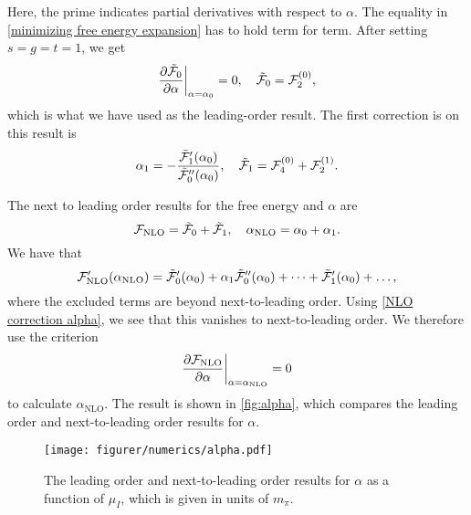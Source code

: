 Here, the prime indicates partial derivatives with respect to $\alpha$.
The equality in \cref{minimizing free energy expansion} has to hold term for term.
After setting $s = g = t = 1$, we get
\begin{align*}
    \diffp{\tilde \Ef_0}{\alpha}\bigg|_{\alpha=\alpha_0} = 0, \quad
    \tilde \Ef_0 = \Ef_2^{(0)},
\end{align*}
which is what we have used as the leading-order result. 
The first correction is on this result is
\begin{equation}
    \label{NLO correction alpha}
    \alpha_1 = - \frac{\tilde {\mathcal{F}}_1'(\alpha_0)}{{\tilde {\mathcal{F}}_0''(\alpha_0)}},
    \quad 
    \tilde {\mathcal{F}}_1 = \mathcal{F}_{4}^{(0)} + \mathcal{F}_{2}^{(1)}.
\end{equation}

The next to leading order results for the free energy and $\alpha$ are
\begin{equation}
    \mathcal{F}_\mathrm{NLO} = \tilde {\mathcal{F}}_0 + \tilde {\mathcal{F}}_1, \quad
    \alpha_\mathrm{NLO} = \alpha_0 + \alpha_1.
\end{equation}
We have that
\begin{equation}
    \mathcal{F}_\mathrm{NLO}'(\alpha_\mathrm{NLO})
    = \tilde {\mathcal{F}}_0'(\alpha_0) + \alpha_1 \tilde {\mathcal{F}}_0''(\alpha_0) + \dots
    + \tilde {\mathcal{F}}_1'(\alpha_0) + \dots,
\end{equation}
where the excluded terms are beyond next-to-leading order.
Using \cref{NLO correction alpha}, we see that this vanishes to next-to-leading order.
We therefore use the criterion
\begin{equation}
    \label{alpha nlo method 2}
    \diffp{\Ef_\mathrm{NLO}}{\alpha} \bigg|_{\alpha=\alpha_{\mathrm{NLO}}} = 0
\end{equation}
to calculate $\alpha_\text{NLO}$.
The result is shown in \autoref{fig:alpha}, which compares the leading order and next-to-leading order results for $\alpha$.

\begin{figure}
    \centering
    \texttt{[image: figurer/numerics/alpha.pdf]}
    \caption{The leading order and next-to-leading order results for $\alpha$ as a function of $\mu_I$, which is given in units of $m_\pi$. }
    \label{fig:alpha}
\end{figure}


